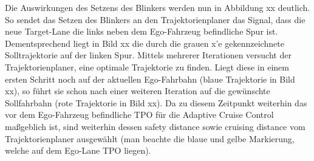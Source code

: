 Die Auswirkungen des Setzens des Blinkers werden nun in Abbildung xx deutlich. So sendet das Setzen des Blinkers an den Trajektorienplaner das Signal, dass die neue Target-Lane die links neben dem Ego-Fahrzeug befindliche Spur ist. Dementsprechend liegt in Bild xx die durch die grauen \glqq x'e\grqq{} gekennzeichnete Solltrajektorie auf der linken Spur. Mittels mehrerer Iterationen versucht der Trajektorienplaner, eine optimale Trajektorie zu finden. Liegt diese in einem ersten Schritt noch auf der aktuellen Ego-Fahrbahn (blaue Trajektorie in Bild xx), so führt sie schon nach einer weiteren Iteration auf die gewünschte Sollfahrbahn (rote Trajektorie in Bild xx). Da zu diesem Zeitpunkt weiterhin das vor dem Ego-Fahrzeug befindliche TPO für die \glqq Adaptive Cruise Control\grqq{} maßgeblich ist, sind weiterhin dessen \glqq safety distance\grqq{} sowie \glqq cruising distance\grqq{} vom Trajektorienplaner ausgewählt (man beachte die blaue und gelbe Markierung, welche auf dem Ego-Lane TPO liegen).
